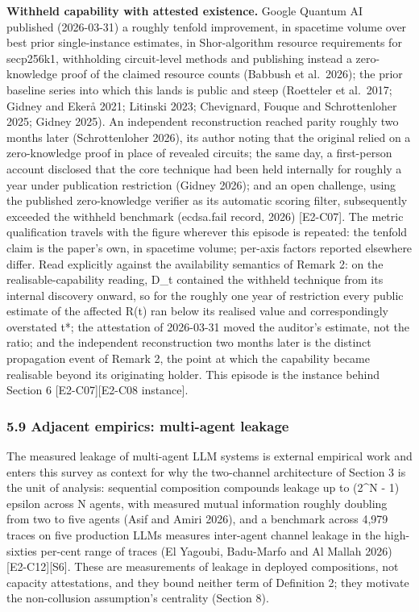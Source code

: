 \documentclass[
  11pt,
]{article}
\begin{document}
\textbf{Withheld capability with attested existence.} Google Quantum AI
published (2026-03-31) a roughly tenfold improvement, in spacetime
volume over best prior single-instance estimates, in Shor-algorithm
resource requirements for secp256k1, withholding circuit-level methods
and publishing instead a zero-knowledge proof of the claimed resource
counts (Babbush et al.~2026); the prior baseline series into which this
lands is public and steep (Roetteler et al.~2017; Gidney and Ekerå 2021;
Litinski 2023; Chevignard, Fouque and Schrottenloher 2025; Gidney 2025).
An independent reconstruction reached parity roughly two months later
(Schrottenloher 2026), its author noting that the original relied on a
zero-knowledge proof in place of revealed circuits; the same day, a
first-person account disclosed that the core technique had been held
internally for roughly a year under publication restriction (Gidney
2026); and an open challenge, using the published zero-knowledge
verifier as its automatic scoring filter, subsequently exceeded the
withheld benchmark (ecdsa.fail record, 2026) {[}E2-C07{]}. The metric
qualification travels with the figure wherever this episode is repeated:
the tenfold claim is the paper's own, in spacetime volume; per-axis
factors reported elsewhere differ. Read explicitly against the
availability semantics of Remark 2: on the realisable-capability
reading, D\_t contained the withheld technique from its internal
discovery onward, so for the roughly one year of restriction every
public estimate of the affected R(t) ran below its realised value and
correspondingly overstated t*; the attestation of 2026-03-31 moved the
auditor's estimate, not the ratio; and the independent reconstruction
two months later is the distinct propagation event of Remark 2, the
point at which the capability became realisable beyond its originating
holder. This episode is the instance behind Section 6
{[}E2-C07{]}{[}E2-C08 instance{]}.

\subsubsection{5.9 Adjacent empirics: multi-agent
leakage}\label{adjacent-empirics-multi-agent-leakage}

The measured leakage of multi-agent LLM systems is external empirical
work and enters this survey as context for why the two-channel
architecture of Section 3 is the unit of analysis: sequential
composition compounds leakage up to (2\^{}N - 1) epsilon across N
agents, with measured mutual information roughly doubling from two to
five agents (Asif and Amiri 2026), and a benchmark across 4,979 traces
on five production LLMs measures inter-agent channel leakage in the
high-sixties per-cent range of traces (El Yagoubi, Badu-Marfo and Al
Mallah 2026) {[}E2-C12{]}{[}S6{]}. These are measurements of leakage in
deployed compositions, not capacity attestations, and they bound neither
term of Definition 2; they motivate the non-collusion assumption's
centrality (Section 8).
\end{document}
